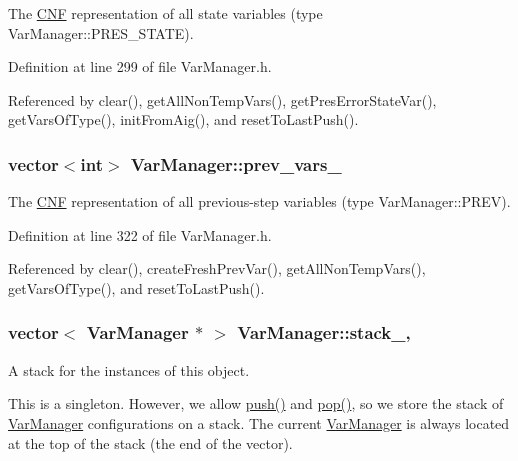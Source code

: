 The \hyperlink{classCNF}{C\-N\-F} representation of all state variables (type Var\-Manager\-::\-P\-R\-E\-S\-\_\-\-S\-T\-A\-T\-E). 



Definition at line 299 of file Var\-Manager.\-h.



Referenced by clear(), get\-All\-Non\-Temp\-Vars(), get\-Pres\-Error\-State\-Var(), get\-Vars\-Of\-Type(), init\-From\-Aig(), and reset\-To\-Last\-Push().

\hypertarget{classVarManager_add744e4a073f7fd7bc595b053ac94774}{
\subsubsection[{prev\-\_\-vars\-\_\-}]{\setlength{\rightskip}{0pt plus 5cm}vector$<$int$>$ Var\-Manager\-::prev\-\_\-vars\-\_\-\hspace{0.3cm}{\ttfamily [protected]}}}\label{classVarManager_add744e4a073f7fd7bc595b053ac94774}


The \hyperlink{classCNF}{C\-N\-F} representation of all previous-\/step variables (type Var\-Manager\-::\-P\-R\-E\-V). 



Definition at line 322 of file Var\-Manager.\-h.



Referenced by clear(), create\-Fresh\-Prev\-Var(), get\-All\-Non\-Temp\-Vars(), get\-Vars\-Of\-Type(), and reset\-To\-Last\-Push().

\hypertarget{classVarManager_aba622884c64d1a16cd086b34cb71acd8}{
\subsubsection[{stack\-\_\-}]{\setlength{\rightskip}{0pt plus 5cm}vector$<$ {\bf Var\-Manager} $\ast$ $>$ Var\-Manager\-::stack\-\_\-\hspace{0.3cm}{\ttfamily [static]}, {\ttfamily [private]}}}\label{classVarManager_aba622884c64d1a16cd086b34cb71acd8}
A stack for the instances of this object.

This is a singleton. However, we allow \hyperlink{classVarManager_a8ca6373bb644693c2995e6473b47566f}{push()} and \hyperlink{classVarManager_a6f2350621a62b97ca06d3469dc9d65f1}{pop()}, so we store the stack of \hyperlink{classVarManager}{Var\-Manager} configurations on a stack. The current \hyperlink{classVarManager}{Var\-Manager} is always located at the top of the stack (the end of the vector). 

